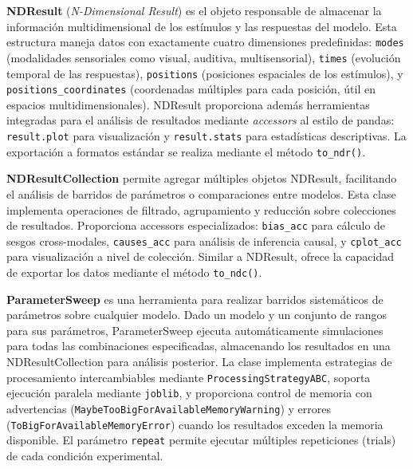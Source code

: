 \textbf{NDResult} (\textit{N-Dimensional Result}) es el objeto responsable de almacenar la información multidimensional de los estímulos y las respuestas del modelo. Esta estructura maneja datos con exactamente cuatro dimensiones predefinidas: \texttt{modes} (modalidades sensoriales como visual, auditiva, multisensorial), \texttt{times} (evolución temporal de las respuestas), \texttt{positions} (posiciones espaciales de los estímulos), y \texttt{positions\_coordinates} (coordenadas múltiples para cada posición, útil en espacios multidimensionales). NDResult proporciona además herramientas integradas para el análisis de resultados mediante \textit{accessors} al estilo de pandas: \texttt{result.plot} para visualización y \texttt{result.stats} para estadísticas descriptivas. La exportación a formatos estándar se realiza mediante el método \texttt{to\_ndr()}.


\textbf{NDResultCollection} permite agregar múltiples objetos NDResult, facilitando el análisis de barridos de parámetros o comparaciones entre modelos. Esta clase implementa operaciones de filtrado, agrupamiento y reducción sobre colecciones de resultados. Proporciona accessors especializados: \texttt{bias\_acc} para cálculo de sesgos cross-modales, \texttt{causes\_acc} para análisis de inferencia causal, y \texttt{cplot\_acc} para visualización a nivel de colección. Similar a NDResult, ofrece la capacidad de exportar los datos mediante el método \texttt{to\_ndc()}.

\textbf{ParameterSweep} es una herramienta para realizar barridos sistemáticos de parámetros sobre cualquier modelo. Dado un modelo y un conjunto de rangos para sus parámetros, ParameterSweep ejecuta automáticamente simulaciones para todas las combinaciones especificadas, almacenando los resultados en una NDResultCollection para análisis posterior. La clase implementa estrategias de procesamiento intercambiables mediante \texttt{ProcessingStrategyABC}, soporta ejecución paralela mediante \texttt{joblib}, y proporciona control de memoria con advertencias (\texttt{MaybeTooBigForAvailableMemoryWarning}) y errores (\texttt{ToBigForAvailableMemoryError}) cuando los resultados exceden la memoria disponible. El parámetro \texttt{repeat} permite ejecutar múltiples repeticiones (trials) de cada condición experimental.

